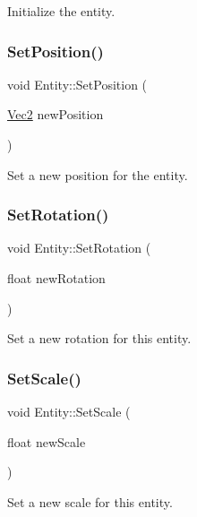 Initialize the entity. \mbox{\label{class_entity_ae4b8c446f4e75b6b531768bc12832276}} 
\subsubsection{\texorpdfstring{Set\+Position()}{SetPosition()}}
{\footnotesize\ttfamily void Entity\+::\+Set\+Position (\begin{DoxyParamCaption}\item[{\mbox{\hyperlink{struct_vec2}{Vec2}}}]{new\+Position }\end{DoxyParamCaption})}

Set a new position for the entity. \mbox{\label{class_entity_a83f149284da6f4dba4274de5c37a408c}} 
\subsubsection{\texorpdfstring{Set\+Rotation()}{SetRotation()}}
{\footnotesize\ttfamily void Entity\+::\+Set\+Rotation (\begin{DoxyParamCaption}\item[{float}]{new\+Rotation }\end{DoxyParamCaption})}

Set a new rotation for this entity. \mbox{\label{class_entity_a096b2532f1357c05b7b45deed900ca2a}} 
\subsubsection{\texorpdfstring{Set\+Scale()}{SetScale()}}
{\footnotesize\ttfamily void Entity\+::\+Set\+Scale (\begin{DoxyParamCaption}\item[{float}]{new\+Scale }\end{DoxyParamCaption})}

Set a new scale for this entity. \mbox{\label{class_entity_a3320db922c2e6a1392144e14c3d6af91}} 
